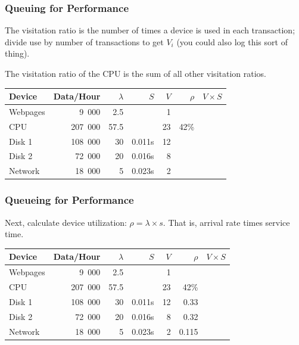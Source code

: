 \begin{frame}
\frametitle{Queuing for Performance}

\begin{changemargin}{1cm}
\large 
The visitation ratio is the number of times a device is used in each transaction; divide use by number of transactions to get $V_{i}$ (you could also log this sort of thing). 

The visitation ratio of the CPU is the sum of all other visitation ratios.
\end{changemargin}

\begin{center}
\begin{tabular}{l|r|r|r|r|r|r} 
	\textbf{Device} & \textbf{Data/Hour} & \textbf{$\lambda$} & \textbf{$S$} & \textbf{$V$} & \textbf{$\rho$} & \textbf{$V \times S$} \\ \hline
	Webpages & 9~000 & 2.5 & & 1 & & \\ \hline
	CPU & 207~000 & 57.5 &  & 23 & 42\% & \\ \hline
	Disk 1 & 108~000 & 30 & 0.011s  & 12& &\\ \hline
	Disk 2 & 72~000 & 20 & 0.016s & 8 & &\\ \hline
	Network & 18~000 & 5 & 0.023s & 2 & &\\ 
\end{tabular}
\end{center}

\end{frame}



\begin{frame}
\frametitle{Queueing for Performance}

\begin{changemargin}{1cm}
\large 
Next, calculate device utilization: $\rho = \lambda \times s$. That is, arrival rate times service time.
\end{changemargin}

\begin{center}
\begin{tabular}{l|r|r|r|r|r|r} 
	\textbf{Device} & \textbf{Data/Hour} & \textbf{$\lambda$} & \textbf{$S$} & \textbf{$V$} & \textbf{$\rho$} & \textbf{$V \times S$} \\ \hline
	Webpages & 9~000 & 2.5 & & 1 & & \\ \hline
	CPU & 207~000 & 57.5 &  & 23 & 42\% & \\ \hline
	Disk 1 & 108~000 & 30 & 0.011s  & 12& 0.33 &\\ \hline
	Disk 2 & 72~000 & 20 & 0.016s & 8 & 0.32 &\\ \hline
	Network & 18~000 & 5 & 0.023s & 2 & 0.115 &\\ 
\end{tabular}
\end{center}

\end{frame}



